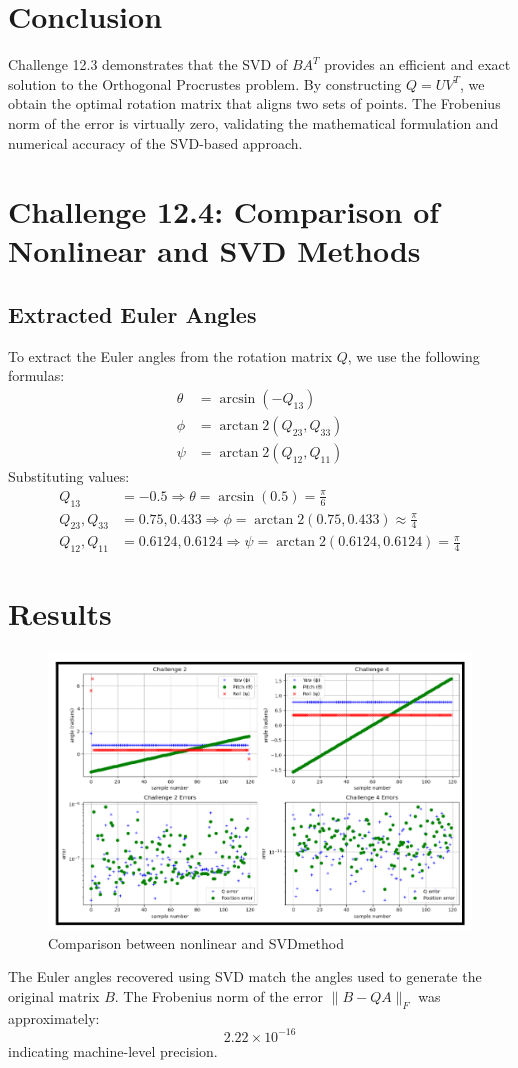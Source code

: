 \documentclass[12pt]{article}
\begin{document}
\section*{Conclusion}
Challenge 12.3 demonstrates that the SVD of \( BA^T \) provides an efficient and exact solution to the Orthogonal Procrustes problem. By constructing \( Q = UV^T \), we obtain the optimal rotation matrix that aligns two sets of points. The Frobenius norm of the error is virtually zero, validating the mathematical formulation and numerical accuracy of the SVD-based approach.



\section*{Challenge 12.4: Comparison of Nonlinear and SVD Methods}

\subsection*{Extracted Euler Angles}
To extract the Euler angles from the rotation matrix \( Q \), we use the following formulas:
\begin{align*}
\theta &= \arcsin(-Q_{13}) \\
\phi &= \arctan2(Q_{23}, Q_{33}) \\
\psi &= \arctan2(Q_{12}, Q_{11})
\end{align*}
Substituting values:
\begin{align*}
Q_{13} &= -0.5 \Rightarrow \theta = \arcsin(0.5) = \frac{\pi}{6} \\
Q_{23}, Q_{33} &= 0.75, 0.433 \Rightarrow \phi = \arctan2(0.75, 0.433) \approx \frac{\pi}{4} \\
Q_{12}, Q_{11} &= 0.6124, 0.6124 \Rightarrow \psi = \arctan2(0.6124, 0.6124) = \frac{\pi}{4}
\end{align*}

\section*{Results}

\begin{figure}[h]
    \centering
    \includegraphics[width=0.5\linewidth]{image 4.png}
    \caption{Comparison between nonlinear and SVDmethod}
    \label{fig:enter-label}
\end{figure}
The Euler angles recovered using SVD match the angles used to generate the original matrix \( B \). The Frobenius norm of the error \( \| B - QA \|_F \) was approximately:
\[
2.22 \times 10^{-16}
\]
indicating machine-level precision.
\end{document}
